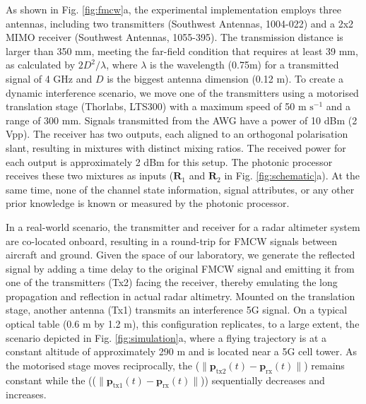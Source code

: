 \documentclass[pdflatex,mathphys]{sty}%
\begin{document}
As shown in Fig. \ref{fig:fmcw}a, the experimental implementation employs three antennas, including two transmitters (Southwest Antennas, 1004-022) and a 2x2 MIMO receiver (Southwest Antennas, 1055-395). The transmission distance is larger than 350 mm, meeting the far-field condition that requires at least 39 mm, as calculated by $2D^2/\lambda$, where $\lambda$ is the wavelength (0.75m) for a transmitted signal of 4 GHz and $D$ is the biggest antenna dimension (0.12 m). To create a dynamic interference scenario, we move one of the transmitters using a motorised translation stage (Thorlabs, LTS300) with a maximum speed of 50 $\textrm{m s}^{-1}$ and a range of 300 mm. Signals transmitted from the AWG have a power of 10 dBm (2 Vpp). The receiver has two outputs, each aligned to an orthogonal polarisation slant, resulting in mixtures with distinct mixing ratios. The received power for each output is approximately 2 dBm for this setup. The photonic processor receives these two mixtures as inputs ($\textbf{R}_1$ and $\textbf{R}_2$ in Fig. \ref{fig:schematic}a). At the same time, none of the channel state information, signal attributes, or any other prior knowledge is known or measured by the photonic processor.

In a real-world scenario, the transmitter and receiver for a radar altimeter system are co-located onboard, resulting in a round-trip for FMCW signals between aircraft and ground. Given the space of our laboratory, we generate the reflected signal by adding a time delay to the original FMCW signal and emitting it from one of the transmitters (Tx2) facing the receiver, thereby emulating the long propagation and reflection in actual radar altimetry. Mounted on the translation stage, another antenna (Tx1) transmits an interference 5G signal. On a typical optical table (0.6 m by 1.2 m), this configuration replicates, to a large extent, the scenario depicted in Fig. \ref{fig:simulation}a, where a flying trajectory is at a constant altitude of approximately 290 m and is located near a 5G cell tower. As the motorised stage moves reciprocally, the ($\|\textbf{p}_{\textrm{tx2}}(t)-\textbf{p}_{\textrm{rx}}(t)\|$) remains constant while the (($\|\textbf{p}_{\textrm{tx1}}(t)-\textbf{p}_{\textrm{rx}}(t)\|$)) sequentially decreases and increases.
\end{document}
